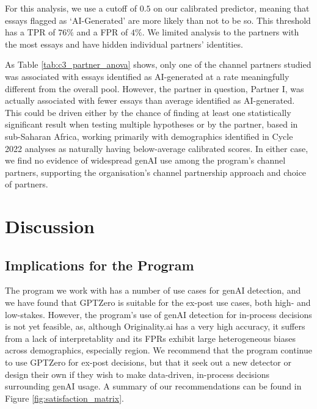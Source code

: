 For this analysis, we use a cutoff of $0.5$ on our calibrated predictor, meaning that essays flagged as `AI-Generated' are more likely than not to be so. This threshold has a TPR of $76\%$ and a FPR of $4\%$. We limited analysis to the partners with the most essays and have hidden individual partners' identities.

As Table \ref{tab:c3_partner_anova} shows, only one of the channel partners studied was associated with essays identified as AI-generated at a rate meaningfully different from the overall pool. However, the partner in question, Partner I, was actually associated with fewer essays than average identified as AI-generated. This could be driven either by the chance of finding at least one statistically significant result when testing multiple hypotheses or by the partner, based in sub-Saharan Africa, working primarily with demographics identified in Cycle 2022 analyses as naturally having below-average calibrated scores. In either case, we find no evidence of widespread genAI use among the program's channel partners, supporting the organisation's channel partnership approach and choice of partners.

\section{Discussion}\label{sec:genaidisc}
\subsection{Implications for the Program}
The program we work with has a number of use cases for genAI detection, and we have found that GPTZero is suitable for the ex-post use cases, both high- and low-stakes. However, the program's use of genAI detection for in-process decisions is not yet feasible, as, although Originality.ai has a very high accuracy, it suffers from a lack of interpretablity and its FPRs exhibit large heterogeneous biases across demographics, especially region. We recommend that the program continue to use GPTZero for ex-post decisions, but that it seek out a new detector or design their own if they wish to make data-driven, in-process decisions surrounding genAI usage. A summary of our recommendations can be found in Figure \ref{fig:satisfaction_matrix}.

